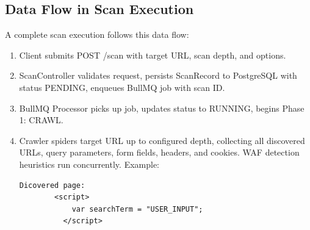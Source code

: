 \subsection{Data Flow in Scan Execution}
A complete scan execution follows this data flow:
\begin{enumerate}[itemsep=2pt, topsep=-15pt]
    \item Client submits POST /scan with target URL, scan depth, and options.
    \item ScanController validates request, persists ScanRecord to PostgreSQL with status PENDING, enqueues BullMQ job with scan ID.
    \item  BullMQ Processor picks up job, updates status to RUNNING, begins Phase 1: CRAWL.
    \item Crawler spiders target URL up to configured depth, collecting all discovered URLs, query parameters, form fields, headers, and cookies. WAF detection heuristics run concurrently.
    Example:
      \begin{Verbatim}[fontsize=\scriptsize]
       Dicovered page:
        <script>
            var searchTerm = "USER_INPUT";
          </script>


\end{Verbatim}
\end{enumerate}
